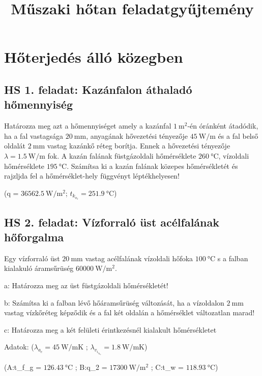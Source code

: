 \documentclass[11pt, a4paper]{report}
\author{}
\title{Műszaki hőtan feladatgyűjtemény}
\begin{document}
\chapter{Hőterjedés álló közegben}
\section*{HS 1. feladat: Kazánfalon áthaladó hőmennyiség}
Határozza meg azt a hőmennyiséget amely a kazánfal $\SI{1}{\meter^2}$-én óránként átadódik, ha a fal vastagsága $\SI{20}{\milli\meter}$, anyagának hővezetési tényezője $\SI{45}{\watt\per\meter}$ és a fal belső oldalát $\SI{2}{\milli\meter}$ vastag kazánkő réteg borítja. Ennek a hővezetési tényezője $\lambda = \SI{1.5}{\watt\per\meter}$ fok. A kazán falának füstgázoldali hőmérséklete $\SI{260}{\celsius}$, vízoldali hőmérséklete $\SI{195}{\celsius}$. Számítsa ki a kazán falának közepes hőmérsékletét és rajzljda fel a hőmérséklet-hely függvényt léptékhelyesen!

        (q =  $ \SI{36562,5}{\watt\per\meter^2}$; $t_k_o_z =  \SI{251.9}{\celsius}$)
        
        
\section*{HS 2. feladat: Vízforraló üst acélfalának hőforgalma}
Egy vízforraló üst $\SI{20}{\milli\meter}$ vastag acélfalának vízoldali hőfoka $\SI{100}{\celsius}$ s a falban kialakuló áramsűrüség $\SI{60000}{\watt\per\meter^2}$.

\vspace{1mm}
\noindent a: Határozza meg az üst füstgázoldali hőmérsékletét!

\vspace{1mm}
\noindent b: Számítsa ki a falban lévő hőáramsűrüség változását, ha a vízoldalon $\SI{2}{\milli\meter}$ vastag vízkőréteg képződik és a fal két oldalán a hőmérséklet változatlan marad!

\vspace{1mm}
\noindent c: Határozza meg a két felületi érintkezésnél kialakult hőmérsékletet

\vspace{1mm}
\noindent Adatok:    ($\lambda_a_c = \SI{45}{\watt\per\meter\K}$ ;
                     $\lambda_v_i_z_k_o = \SI{1,8}{\watt\per\meter\K}$)
                     
\vspace{1mm}
(A:t_f_g = $\SI{126,43}{\celsius}$ ; B:q_2 = $\SI{17300}{\watt\per\meter^2}$ ; C:t_w = $\SI{118,93}{\celsius}$)




\end{document}
